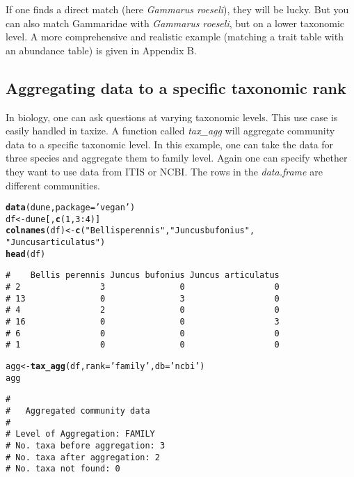 \documentclass[10pt,a4paper,twocolumn]{article}\usepackage[]{graphicx}\usepackage[]{color}
\makeatletter
\newcommand{\hlnum}[1]{\textcolor[rgb]{0.686,0.059,0.569}{#1}}%
\newcommand{\hlstr}[1]{\textcolor[rgb]{0.192,0.494,0.8}{#1}}%
\newcommand{\hlopt}[1]{\textcolor[rgb]{0,0,0}{#1}}%
\newcommand{\hlstd}[1]{\textcolor[rgb]{0.345,0.345,0.345}{#1}}%
\newcommand{\hlkwb}[1]{\textcolor[rgb]{0.69,0.353,0.396}{#1}}%
\newcommand{\hlkwc}[1]{\textcolor[rgb]{0.333,0.667,0.333}{#1}}%
\newcommand{\hlkwd}[1]{\textcolor[rgb]{0.737,0.353,0.396}{\textbf{#1}}}%
\newenvironment{kframe}{%
 \def\at@end@of@kframe{}%
 \ifinner\ifhmode%
  \def\at@end@of@kframe{\end{minipage}}%
  \begin{minipage}{\columnwidth}%
 \fi\fi%
 \def\FrameCommand##1{\hskip\@totalleftmargin \hskip-\fboxsep
 \colorbox{shadecolor}{##1}\hskip-\fboxsep
     \hskip-\linewidth \hskip-\@totalleftmargin \hskip\columnwidth}%
 \MakeFramed {\advance\hsize-\width
   \@totalleftmargin\z@ \linewidth\hsize
   \@setminipage}}%
 {\par\unskip\endMakeFramed%
 \at@end@of@kframe}
\newenvironment{knitrout}{}{} %
\makeatother
\begin{document}
If one finds a direct match (here \emph{Gammarus roeseli}), they will be lucky. But you can also match Gammaridae with \emph{Gammarus roeseli}, but on a lower taxonomic level. A more comprehensive and realistic example (matching a trait table with an abundance table) is given in Appendix B.


\subsection*{Aggregating data to a specific taxonomic rank}
In biology, one can ask questions at varying taxonomic levels. This use case is easily handled in taxize. A function called \emph{tax\_agg} will aggregate community data to a specific taxonomic level. In this example, one can take the data for three species and aggregate them to family level. Again one can specify whether they want to use data from ITIS or NCBI. The rows in the \emph{data.frame} are different communities.

\begin{knitrout}\scriptsize
{}\color{fgcolor}\begin{kframe}
\begin{alltt}
\hlkwd{data}\hlstd{(dune,} \hlkwc{package} \hlstd{=} \hlstr{'vegan'}\hlstd{)}
\hlstd{df} \hlkwb{<-} \hlstd{dune[ ,} \hlkwd{c}\hlstd{(}\hlnum{1}\hlstd{,}\hlnum{3}\hlopt{:}\hlnum{4}\hlstd{)]}
\hlkwd{colnames}\hlstd{(df)} \hlkwb{<-} \hlkwd{c}\hlstd{(}\hlstr{"Bellis perennis"}\hlstd{,} \hlstr{"Juncus bufonius"}\hlstd{,}
                  \hlstr{"Juncus articulatus"}\hlstd{)}
\hlkwd{head}\hlstd{(df)}
\end{alltt}
\begin{verbatim}
#    Bellis perennis Juncus bufonius Juncus articulatus
# 2                3               0                  0
# 13               0               3                  0
# 4                2               0                  0
# 16               0               0                  3
# 6                0               0                  0
# 1                0               0                  0
\end{verbatim}
\end{kframe}
\end{knitrout}


\begin{knitrout}\scriptsize
{}\color{fgcolor}\begin{kframe}
\begin{alltt}
\hlstd{agg} \hlkwb{<-} \hlkwd{tax_agg}\hlstd{(df,} \hlkwc{rank} \hlstd{=} \hlstr{'family'}\hlstd{,} \hlkwc{db} \hlstd{=} \hlstr{'ncbi'}\hlstd{)}
\hlstd{agg}
\end{alltt}
\begin{verbatim}
# 
# 	Aggregated community data
# 
# Level of Aggregation: FAMILY
# No. taxa before aggregation: 3
# No. taxa after aggregation: 2
# No. taxa not found: 0
\end{verbatim}
\end{kframe}
\end{knitrout}
\end{document}
